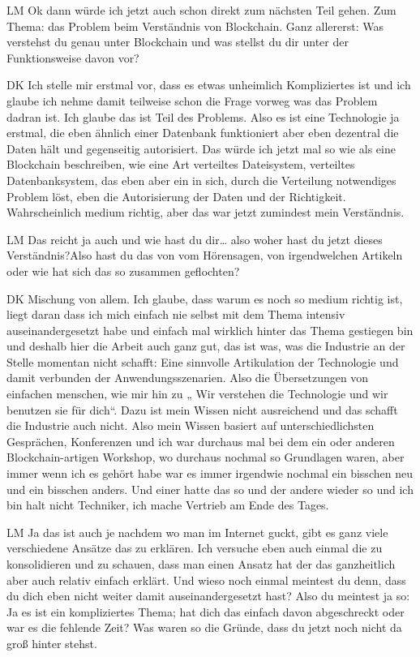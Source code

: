 \begin{xlist}
     \item[LM] Ok dann würde ich jetzt auch schon direkt zum nächsten Teil gehen. Zum Thema: das Problem beim Verständnis von Blockchain. Ganz allererst: Was verstehst du genau unter Blockchain und was stellst du dir unter der Funktionsweise davon vor?
     \item[DK] Ich stelle mir erstmal vor, dass es etwas unheimlich Kompliziertes ist und ich glaube ich nehme damit teilweise schon die Frage vorweg was das Problem dadran ist. Ich glaube das ist Teil des Problems. Also es ist eine Technologie ja erstmal, die eben ähnlich einer Datenbank funktioniert aber eben dezentral die Daten hält und gegenseitig autorisiert. Das würde ich jetzt mal so wie als eine Blockchain beschreiben, wie eine Art verteiltes Dateisystem, verteiltes Datenbanksystem, das eben aber ein in sich, durch die Verteilung notwendiges Problem löst, eben die Autorisierung der Daten und der Richtigkeit. Wahrscheinlich medium richtig, aber das war jetzt zumindest mein Verständnis.
     \item[LM] Das reicht ja auch und wie hast du dir… also woher hast du jetzt dieses Verständnis?Also hast du das von vom Hörensagen, von irgendwelchen Artikeln oder wie hat sich das so zusammen geflochten?
     \item[DK] Mischung von allem. Ich glaube, dass warum es noch so medium richtig ist, liegt daran dass ich mich einfach nie selbst mit dem Thema intensiv auseinandergesetzt habe und einfach mal wirklich hinter das Thema gestiegen bin und deshalb hier die Arbeit auch ganz gut, das ist was, was die Industrie an der Stelle momentan nicht schafft: Eine sinnvolle Artikulation der Technologie und damit verbunden der Anwendungsszenarien. Also die Übersetzungen von einfachen menschen, wie mir hin zu „ Wir verstehen die Technologie und wir benutzen sie für dich“. Dazu ist mein Wissen nicht ausreichend und das schafft die Industrie auch nicht. Also mein Wissen basiert auf unterschiedlichsten Gesprächen, Konferenzen und ich war durchaus mal bei dem ein oder anderen Blockchain-artigen Workshop, wo durchaus nochmal so Grundlagen waren, aber immer wenn ich es gehört habe war es immer irgendwie nochmal ein bisschen neu und ein bisschen anders. Und einer hatte das so und der andere wieder so und ich bin halt nicht Techniker, ich mache Vertrieb am Ende des Tages.
     \item[LM] Ja das ist auch je nachdem wo man im Internet guckt, gibt es ganz viele verschiedene Ansätze das zu erklären. Ich versuche eben auch einmal die zu konsolidieren und zu schauen, dass man einen Ansatz hat der das ganzheitlich aber auch relativ einfach erklärt. Und wieso noch einmal meintest du denn, dass du dich eben nicht weiter damit auseinandergesetzt hast? Also du meintest ja so: Ja es ist ein kompliziertes Thema; hat dich das einfach davon abgeschreckt oder war es die fehlende Zeit? Was waren so die Gründe, dass du jetzt noch nicht da groß hinter stehst. 

\end{xlist}
